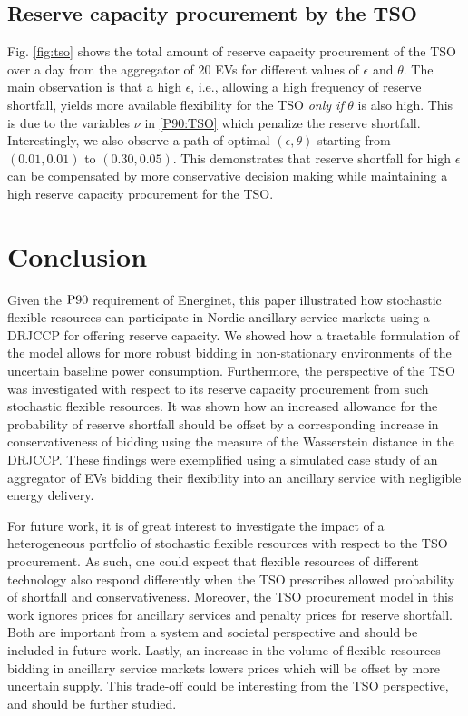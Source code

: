 \documentclass[conference]{IEEEtran}
\begin{document}
\subsection{Reserve capacity procurement by the \ac{TSO}}\label{sec:motivation}
\vspace{-1mm}
Fig. \ref{fig:tso} shows the total amount of reserve capacity procurement of the \ac{TSO} over a day from the aggregator of 20 EVs for different values of $\epsilon$ and $\theta$. The main observation is that a high $\epsilon$, i.e., allowing a high frequency of reserve shortfall, yields more available flexibility for the \ac{TSO} \textit{only if} $\theta$ is also high. This is due to the variables $\nu$ in \eqref{P90:TSO} which penalize the reserve shortfall. Interestingly, we also observe a path of optimal $(\epsilon, \theta)$ starting from $(0.01, 0.01)$ to $(0.30, 0.05)$. This demonstrates that reserve shortfall for high $\epsilon$ can be compensated by more conservative decision making while maintaining a high reserve capacity procurement for the \ac{TSO}.


\vspace{2mm}
\section{Conclusion}
\vspace{-1mm}
Given the $\rm{P90}$ requirement of Energinet, this paper illustrated how stochastic flexible resources can participate in Nordic ancillary service markets using a \ac{DRJCCP} for offering reserve capacity. We showed how a tractable formulation of the model allows for more robust bidding in non-stationary environments of the uncertain baseline power consumption. Furthermore, the perspective of the \ac{TSO} was investigated with respect to its reserve capacity procurement from such stochastic flexible resources. It was shown how an increased allowance for the probability of reserve shortfall should be offset by a corresponding increase in conservativeness of bidding using the measure of the Wasserstein distance in the \ac{DRJCCP}. These findings were exemplified using a simulated case study of an aggregator of \acp{EV} bidding their flexibility into an ancillary service with negligible energy delivery.

For future work, it is of great interest to investigate the impact of a heterogeneous portfolio of stochastic flexible resources with respect to the \ac{TSO} procurement. As such, one could expect that flexible resources of different technology also respond differently when the \ac{TSO} prescribes allowed probability of shortfall and conservativeness. Moreover, the \ac{TSO} procurement model in this work ignores prices for ancillary services and penalty prices for reserve shortfall. Both are important from a system and societal perspective and should be included in future work. Lastly, an increase in the volume of flexible resources bidding in ancillary service markets lowers prices which will be offset by more uncertain supply. This trade-off could be interesting from the \ac{TSO} perspective, and should be  further studied.
\end{document}
